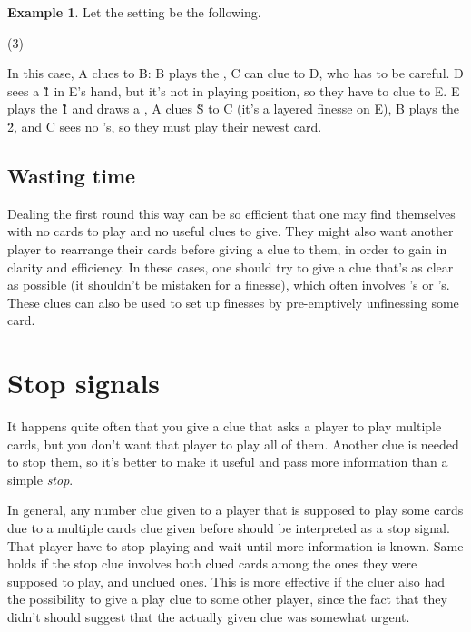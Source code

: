 \documentclass[a4paper]{article}
\theoremstyle{plain}
\theoremstyle{definition}
\newtheorem{example}[theorem]{Example}
\begin{document}
\begin{example}
	
	Let the setting be the following.
	
	\begin{tasks}(3)
		\task[+]      
		\task[A]    
		\task[B]    
		\task[C]    
		\task[D]    
		\task[E]    
	\end{tasks}
	
	In this case, A clues  to B: B plays the , C can clue  to D, who has to be careful. D sees a \G{1} in E's hand, but it's not in playing position, so they have to clue  to E. E plays the \G{1} and draws a , A clues \G{S} to C (it's a layered finesse on E), B plays the \G{2}, and C sees no 's, so they must play their newest card.
\end{example}

\subsection{Wasting time}

Dealing the first round this way can be so efficient that one may find themselves with no cards to play and no useful clues to give. They might also want another player to rearrange their cards before giving a clue to them, in order to gain in clarity and efficiency. In these cases, one should try to give a clue that's as clear as possible (it shouldn't be mistaken for a finesse), which often involves 's or 's. These clues can also be used to set up finesses by pre-emptively unfinessing some card. 
                                                           
\section{Stop signals}
\label{stopsignals}

It happens quite often that you give a clue that asks a player to play multiple cards, but you don't want that player to play all of them. Another clue is needed to stop them, so it's better to make it useful and pass more information than a simple \textit{stop}.

In general, any number clue given to a player that is supposed to play some cards due to a multiple cards clue given before should be interpreted as a stop signal. That player have to stop playing and wait until more information is known. Same holds if the stop clue involves both clued cards among the ones they were supposed to play, and unclued ones. This is more effective if the cluer also had the possibility to give a play clue to some other player, since the fact that they didn't should suggest that the actually given clue was somewhat urgent.
\end{document}
